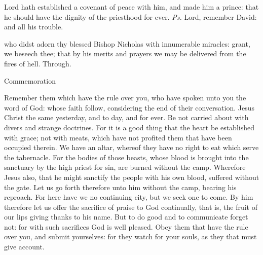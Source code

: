 
\introit
{} Lord hath established a covenant of peace with him, and made him a prince: that he should have the dignity of the priesthood for ever. \textit{Ps.} Lord, remember David: and all his trouble.

\collect
{} who didst adorn thy blessed Bishop Nicholas with innumerable miracles: grant, we beseech thee; that by his merits and prayers we may be delivered from the fires of hell. Through.

\begin{rubric}
	Commemoration 
\end{rubric}

 Remember them which have the rule over you, who have spoken unto you the word of God: whose faith follow, considering the end of their conversation. Jesus Christ the same yesterday, and to day, and for ever. Be not carried about with divers and strange doctrines. For it is a good thing that the heart be established with grace; not with meats, which have not profited them that have been occupied therein. We have an altar, whereof they have no right to eat which serve the tabernacle. For the bodies of those beasts, whose blood is brought into the sanctuary by the high priest for sin, are burned without the camp. Wherefore Jesus also, that he might sanctify the people with his own blood, suffered without the gate. Let us go forth therefore unto him without the camp, bearing his reproach. For here have we no continuing city, but we seek one to come. By him therefore let us offer the sacrifice of praise to God continually, that is, the fruit of our lips giving thanks to his name. But to do good and to communicate forget not: for with such sacrifices God is well pleased. Obey them that have the rule over you, and submit yourselves: for they watch for your souls, as they that must give account.


\vspace{-0.4\baselineskip}


